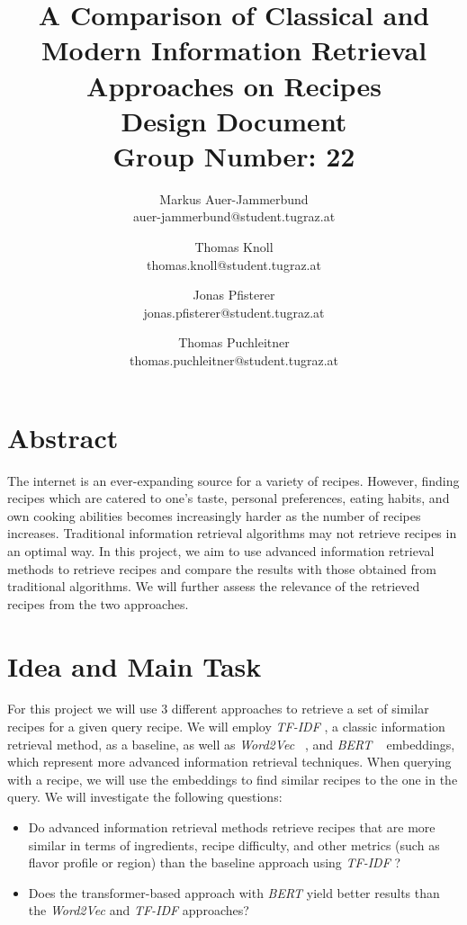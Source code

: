 \documentclass{article}
\title{\textbf{A Comparison of Classical and Modern Information Retrieval Approaches on Recipes} \\ 
    Design Document \\
    Group Number: 22}
\author{Markus Auer-Jammerbund \\ auer-jammerbund@student.tugraz.at
 \and Thomas Knoll \\ thomas.knoll@student.tugraz.at
 \and Jonas Pfisterer \\ jonas.pfisterer@student.tugraz.at
 \and Thomas Puchleitner \\ thomas.puchleitner@student.tugraz.at}
\newcommand{\wordtovec}{\textit{Word2Vec} }
\newcommand{\bert}{\textit{BERT} }
\newcommand{\tfidf}{\textit{TF-IDF} }
\begin{document}
\maketitle

\section{Abstract}
The internet is an ever-expanding source for a variety of recipes. 
However, finding recipes which are catered to one's taste, personal preferences, eating habits, and own cooking abilities becomes increasingly harder as the number of recipes increases.
Traditional information retrieval algorithms may not retrieve recipes in an optimal way.
In this project, we aim to use advanced information retrieval methods to retrieve recipes and compare the results with those obtained from traditional algorithms.
We will further assess the relevance of the retrieved recipes from the two approaches. 


\section{Idea and Main Task}
For this project we will use 3 different approaches to retrieve a set of similar recipes for a given query recipe.
We will employ \tfidf, a classic information retrieval method, as a baseline, as well as \wordtovec~\cite{word2vec}, and \bert~\cite{bert} embeddings, which represent more advanced information retrieval techniques.
When querying with a recipe, we will use the embeddings to find similar recipes to the one in the query.
We will investigate the following questions:
\begin{itemize}
    \item Do advanced information retrieval methods retrieve recipes that are more similar in terms of ingredients, recipe difficulty, and other metrics (such as flavor profile or region) than the baseline approach using \tfidf?
    \item Does the transformer-based approach with \bert yield better results than the \wordtovec and \tfidf approaches?
\end{itemize}
\end{document}
